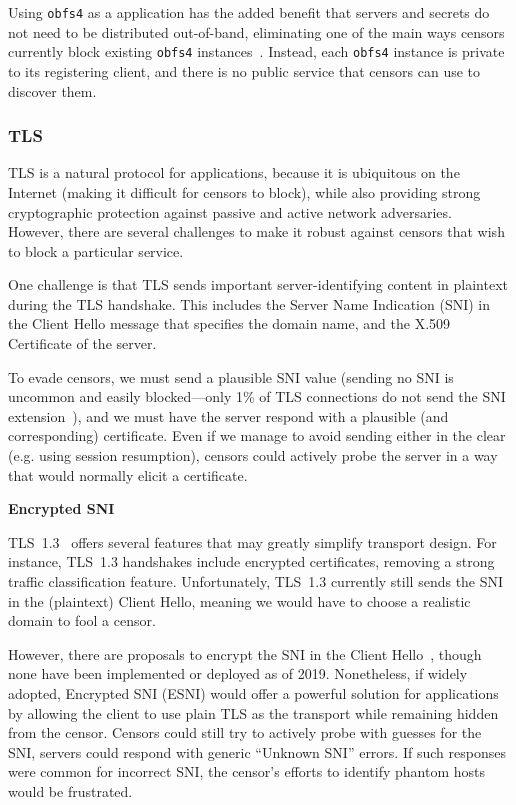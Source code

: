 \documentclass[sigconf,anonymous]{acmart}
\renewcommand{\paragraph}[1]{\smallskip\noindent\textbf{#1\quad}}
\begin{document}
Using \texttt{obfs4} as a \scheme application has the added benefit that servers
and secrets do not need to be distributed out-of-band, eliminating one of the
main ways censors currently block existing \texttt{obfs4}
instances~\cite{tor-bridge-blocking-blog}. Instead, each \scheme \texttt{obfs4}
instance is private to its registering client, and there is no public service
that censors can use to discover them.



\subsubsection{TLS}

TLS is a natural protocol for \scheme applications, because it is ubiquitous on
the Internet (making it difficult for censors to block), while also providing
strong cryptographic protection against passive and active network adversaries.
However, there are several challenges to make it robust against censors that
wish to block a particular service.

One challenge is that TLS sends important server-identifying content in plaintext
during the TLS handshake. This includes the Server Name Indication (SNI) in the
Client Hello message that specifies the domain name, and the
X.509 Certificate of the server.

To evade censors, we must send a plausible SNI value (sending no SNI is
uncommon and easily blocked---only 1\% of TLS connections
do not send the SNI extension~\cite{tls-fingerprint}), and we must have the server respond with
a plausible (and corresponding) certificate. Even if we manage to avoid sending
either in the clear (e.g. using session resumption), censors could actively probe
the server in a way that would normally elicit a certificate.


\paragraph{Encrypted SNI}
\label{esni}

TLS~1.3~\cite{tls13} offers several features that may greatly simplify 
\scheme transport design. For instance, TLS~1.3 handshakes include encrypted
certificates, removing a strong traffic classification feature.
Unfortunately, TLS~1.3 currently still sends the SNI in the (plaintext) Client
Hello, meaning we would have to choose a realistic domain to fool a censor.

However, there are proposals to encrypt the SNI in the Client Hello~\cite{ietf-tls-esni-02},
though none have been implemented or deployed as of 2019. Nonetheless,
if widely adopted, Encrypted SNI (ESNI) would offer a powerful solution for
\scheme applications by allowing the client to use plain TLS as the transport
while remaining hidden from the censor.
Censors could still try to actively probe with guesses for the SNI,
servers could respond with generic ``Unknown SNI'' errors. If such responses
were common for incorrect SNI, the censor's efforts to identify phantom hosts
would be frustrated.
\end{document}
